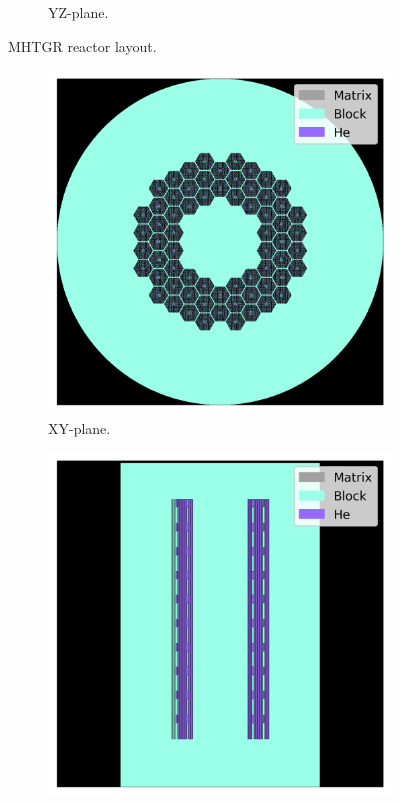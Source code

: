 \documentclass[11pt,letterpaper]{article}
\begin{document}
\begin{figure}[]
\begin{subfigure}[t]{0.4\textwidth}
			\caption{YZ-plane.}
		\end{subfigure}
		\hfill
		\caption{MHTGR reactor layout.}
		\label{fig:layout}
	\end{figure}

	\begin{figure}[]
		\centering
		\begin{subfigure}[t]{0.4\textwidth}
			\centering
			\includegraphics[width=\linewidth]{figures/fullcore.png}
			\caption{XY-plane.}
		\end{subfigure}
		\begin{subfigure}[t]{0.4\textwidth}
			\centering
			\includegraphics[width=\linewidth]{figures/fullcore2.png}

\end{subfigure}
\end{figure}
\end{document}

